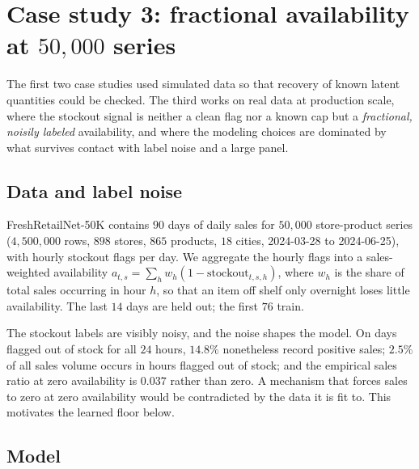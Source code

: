 \section{Case study 3: fractional availability at $50{,}000$ series}\label{sec:cs3}

The first two case studies used simulated data so that recovery of known latent quantities could be checked. The third works on real data at production scale, where the stockout signal is neither a clean flag nor a known cap but a \emph{fractional, noisily labeled} availability, and where the modeling choices are dominated by what survives contact with label noise and a large panel.

\subsection{Data and label noise}\label{sec:cs3-data}

FreshRetailNet-50K \citep{wang2025freshretailnet} contains $90$ days of daily sales for $50{,}000$ store-product series ($4{,}500{,}000$ rows, $898$ stores, $865$ products, $18$ cities, 2024-03-28 to 2024-06-25), with hourly stockout flags per day. We aggregate the hourly flags into a sales-weighted availability $a_{t,s} = \sum_h w_h (1 - \text{stockout}_{t,s,h})$, where $w_h$ is the share of total sales occurring in hour $h$, so that an item off shelf only overnight loses little availability. The last $14$ days are held out; the first $76$ train.

The stockout labels are visibly noisy, and the noise shapes the model. On days flagged out of stock for all $24$ hours, $14.8\%$ nonetheless record positive sales; $2.5\%$ of all sales volume occurs in hours flagged out of stock; and the empirical sales ratio at zero availability is $0.037$ rather than zero. A mechanism that forces sales to zero at zero availability would be contradicted by the data it is fit to. This motivates the learned floor below.

\subsection{Model}\label{sec:cs3-model}

